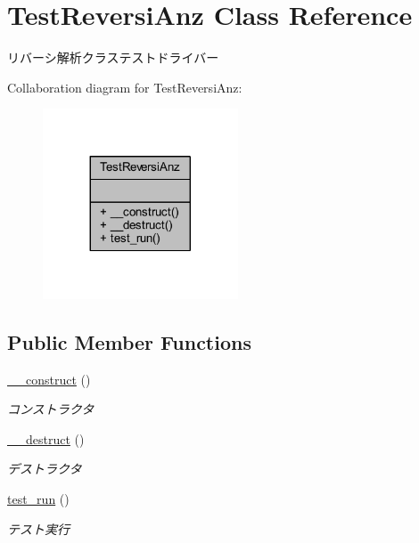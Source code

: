 \hypertarget{class_test_reversi_anz}{}\section{Test\+Reversi\+Anz Class Reference}
\label{class_test_reversi_anz}


リバーシ解析クラステストドライバー  




Collaboration diagram for Test\+Reversi\+Anz\+:\nopagebreak
\begin{figure}[H]
\begin{center}
\leavevmode
\includegraphics[width=164pt]{class_test_reversi_anz__coll__graph}
\end{center}
\end{figure}
\subsection*{Public Member Functions}
\begin{DoxyCompactItemize}
\item 
\hyperlink{class_test_reversi_anz_a095c5d389db211932136b53f25f39685}{\+\_\+\+\_\+construct} ()
\begin{DoxyCompactList}\small\item\em コンストラクタ \end{DoxyCompactList}\item 
\hyperlink{class_test_reversi_anz_a421831a265621325e1fdd19aace0c758}{\+\_\+\+\_\+destruct} ()
\begin{DoxyCompactList}\small\item\em デストラクタ \end{DoxyCompactList}\item 
\hyperlink{class_test_reversi_anz_a9b029832cfdf19c0ef36b1f5ef7b7735}{test\+\_\+run} ()
\begin{DoxyCompactList}\small\item\em テスト実行 \end{DoxyCompactList}\end{DoxyCompactItemize}


